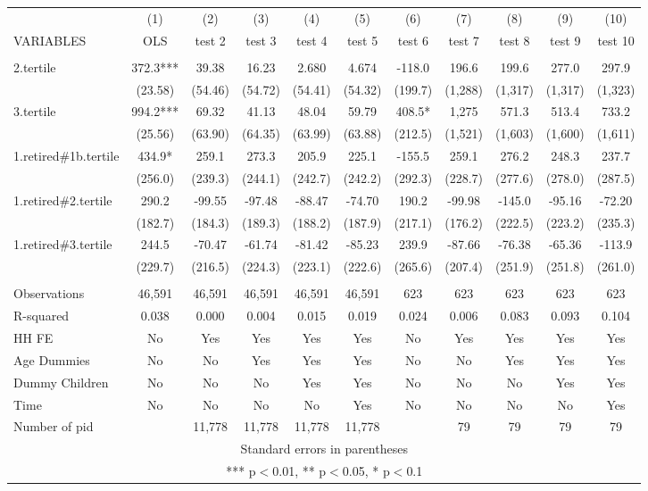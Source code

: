 \begin{tabular}{lcccccccccc} \hline
 & (1) & (2) & (3) & (4) & (5) & (6) & (7) & (8) & (9) & (10) \\
VARIABLES & OLS & test 2 & test 3 & test 4 & test 5 & test 6 & test 7 & test 8 & test 9 & test 10 \\ \hline
 &  &  &  &  &  &  &  &  &  &  \\
2.tertile & 372.3*** & 39.38 & 16.23 & 2.680 & 4.674 & -118.0 & 196.6 & 199.6 & 277.0 & 297.9 \\
 & (23.58) & (54.46) & (54.72) & (54.41) & (54.32) & (199.7) & (1,288) & (1,317) & (1,317) & (1,323) \\
3.tertile & 994.2*** & 69.32 & 41.13 & 48.04 & 59.79 & 408.5* & 1,275 & 571.3 & 513.4 & 733.2 \\
 & (25.56) & (63.90) & (64.35) & (63.99) & (63.88) & (212.5) & (1,521) & (1,603) & (1,600) & (1,611) \\
1.retired\#1b.tertile & 434.9* & 259.1 & 273.3 & 205.9 & 225.1 & -155.5 & 259.1 & 276.2 & 248.3 & 237.7 \\
 & (256.0) & (239.3) & (244.1) & (242.7) & (242.2) & (292.3) & (228.7) & (277.6) & (278.0) & (287.5) \\
1.retired\#2.tertile & 290.2 & -99.55 & -97.48 & -88.47 & -74.70 & 190.2 & -99.98 & -145.0 & -95.16 & -72.20 \\
 & (182.7) & (184.3) & (189.3) & (188.2) & (187.9) & (217.1) & (176.2) & (222.5) & (223.2) & (235.3) \\
1.retired\#3.tertile & 244.5 & -70.47 & -61.74 & -81.42 & -85.23 & 239.9 & -87.66 & -76.38 & -65.36 & -113.9 \\
 & (229.7) & (216.5) & (224.3) & (223.1) & (222.6) & (265.6) & (207.4) & (251.9) & (251.8) & (261.0) \\
 &  &  &  &  &  &  &  &  &  &  \\
Observations & 46,591 & 46,591 & 46,591 & 46,591 & 46,591 & 623 & 623 & 623 & 623 & 623 \\
R-squared & 0.038 & 0.000 & 0.004 & 0.015 & 0.019 & 0.024 & 0.006 & 0.083 & 0.093 & 0.104 \\
HH FE & No & Yes & Yes & Yes & Yes & No & Yes & Yes & Yes & Yes \\
Age Dummies & No & No & Yes & Yes & Yes & No & No & Yes & Yes & Yes \\
Dummy Children & No & No & No & Yes & Yes & No & No & No & Yes & Yes \\
Time & No & No & No & No & Yes & No & No & No & No & Yes \\
 Number of pid &  & 11,778 & 11,778 & 11,778 & 11,778 &  & 79 & 79 & 79 & 79 \\ \hline
\multicolumn{11}{c}{ Standard errors in parentheses} \\
\multicolumn{11}{c}{ *** p$<$0.01, ** p$<$0.05, * p$<$0.1} \\
\end{tabular}
